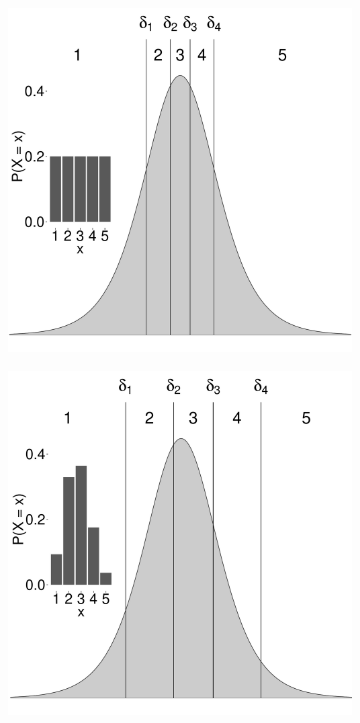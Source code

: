 \documentclass{article}
\begin{document}
\begin{figure}[!ht]
	\centering
	\begin{subfigure}{.5\textwidth}
		\centering
		\includegraphics[width=.98\textwidth]{figures/orderedLogisticUnbiased.pdf}
	\end{subfigure}%
	\begin{subfigure}{.5\textwidth}
		\centering
		\includegraphics[width=.98\textwidth]{figures/orderedLogisticBiased.pdf}

\end{subfigure}
\end{figure}
\end{document}
